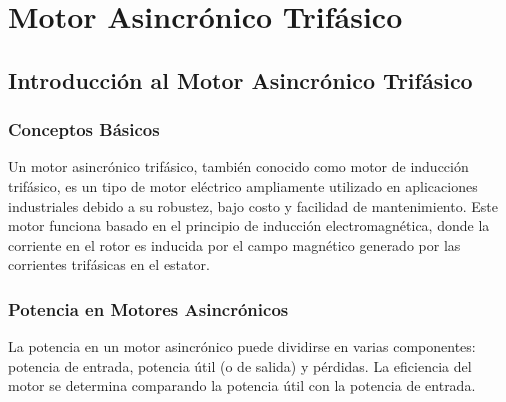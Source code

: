 \documentclass[../main]{subfiles}
\begin{document}
\chapter{Motor Asincrónico Trifásico}

\section{Introducción al Motor Asincrónico Trifásico}

\subsection{Conceptos Básicos}

Un motor asincrónico trifásico, también conocido como motor de inducción trifásico, es un tipo de motor eléctrico ampliamente utilizado en aplicaciones industriales debido a su robustez, bajo costo y facilidad de mantenimiento. Este motor funciona basado en el principio de inducción electromagnética, donde la corriente en el rotor es inducida por el campo magnético generado por las corrientes trifásicas en el estator.


\subsection{Potencia en Motores Asincrónicos}

La potencia en un motor asincrónico puede dividirse en varias componentes: potencia de entrada, potencia útil (o de salida) y pérdidas. La eficiencia del motor se determina comparando la potencia útil con la potencia de entrada.
\end{document}

